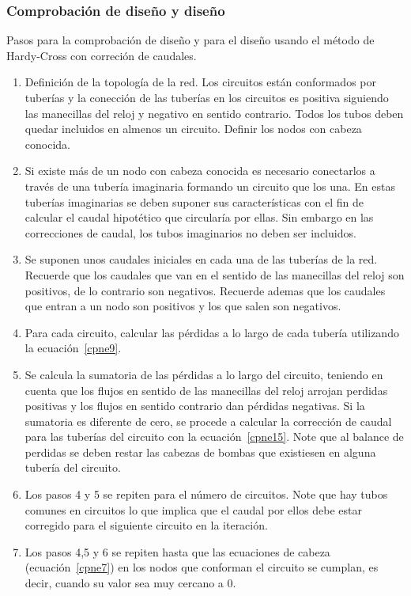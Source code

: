 \documentclass[11pt, oneside]{article}
\begin{document}
\subsubsection*{Comprobaci\'on de dise\~no y dise\~no}
Pasos para la comprobaci\'on de dise\~no y para el dise\~no usando el m\'etodo de Hardy-Cross con correci\'on de caudales.
\begin{enumerate}
\item Definici\'on de la topolog\'ia de la red. Los circuitos est\'an conformados por tuber\'ias y la conecci\'on de las tuber\'ias en los circuitos es positiva siguiendo las manecillas del reloj y negativo en sentido contrario. Todos los tubos deben quedar incluidos en almenos un circuito. Definir los nodos con cabeza conocida. 
\item Si existe m\'as de un nodo con cabeza conocida es necesario conectarlos a trav\'es de una tuber\'ia imaginaria formando un circuito que los una. En estas tuber\'ias imaginarias se deben suponer sus caracter\'isticas con el fin de calcular el caudal hipot\'etico que circular\'ia por ellas. Sin embargo en las correcciones de caudal, los tubos imaginarios no deben ser incluidos.
\item Se suponen unos caudales iniciales en cada una de las tuber\'ias de la red. Recuerde que los caudales que van en el sentido de las manecillas del reloj son positivos, de lo contrario son negativos. Recuerde ademas que los caudales que entran a un nodo son positivos y los que salen son negativos.
\item Para cada circuito, calcular las p\'erdidas a lo largo de cada tuber\'ia utilizando la ecuaci\'on~\ref{cpne9}.
\item Se calcula la sumatoria de las p\'erdidas a lo largo del circuito, teniendo en cuenta que los flujos en sentido de las manecillas del reloj arrojan perdidas positivas y los flujos en sentido contrario dan p\'erdidas negativas. Si la sumatoria es diferente de cero, se procede a calcular la correcci\'on de caudal para las tuber\'ias del circuito con la ecuaci\'on~\ref{cpne15}. Note que al balance de perdidas se deben restar las cabezas de bombas que existiesen en alguna tuber\'ia del circuito. 
\item Los pasos 4 y 5 se repiten para el n\'umero de circuitos. Note que hay tubos comunes en circuitos lo que implica que el caudal por ellos debe estar corregido para el siguiente circuito en la iteraci\'on. 
\item Los pasos 4,5 y 6 se repiten hasta que las ecuaciones de cabeza (ecuaci\'on~\ref{cpne7}) en los nodos que conforman el circuito se cumplan, es decir, cuando su valor sea muy cercano a 0.  
\end{enumerate}
\end{document}
